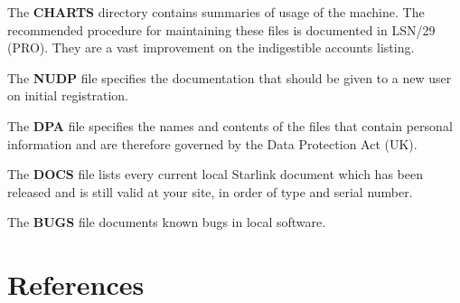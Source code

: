 The {\bf CHARTS} directory contains summaries of usage of the machine.
The recommended procedure for maintaining these files is documented in LSN/29
(PRO).
They are a vast improvement on the indigestible accounts listing.

The {\bf NUDP} file specifies the documentation that should be given to a new
user on initial registration.

The {\bf DPA} file specifies the names and contents of the files that contain
personal information and are therefore governed by the Data Protection Act (UK).

The {\bf DOCS} file lists every current local Starlink document which has been
released and is still valid at your site, in order of type and serial number.

The {\bf BUGS} file documents known bugs in local software.

\section {References}

